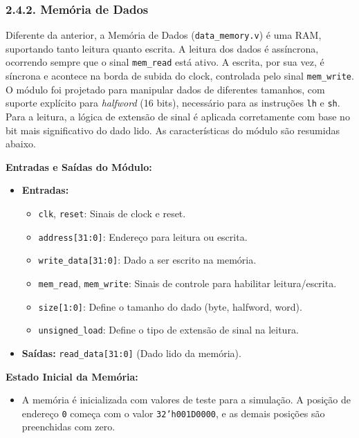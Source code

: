 \documentclass[12pt, a4paper]{article}
\begin{document}
\subsubsection*{2.4.2. Memória de Dados}

Diferente da anterior, a Memória de Dados (\texttt{data\_memory.v}) é uma RAM, suportando tanto leitura quanto escrita. A leitura dos dados é assíncrona, ocorrendo sempre que o sinal \texttt{mem\_read} está ativo. A escrita, por sua vez, é síncrona e acontece na borda de subida do clock, controlada pelo sinal \texttt{mem\_write}.
\\[0.5cm]
O módulo foi projetado para manipular dados de diferentes tamanhos, com suporte explícito para \textit{halfword} (16 bits), necessário para as instruções \texttt{lh} e \texttt{sh}. Para a leitura, a lógica de extensão de sinal é aplicada corretamente com base no bit mais significativo do dado lido. As características do módulo são resumidas abaixo.

\vspace{0.5cm}
\textbf{Entradas e Saídas do Módulo:}
\begin{itemize}
    \item \textbf{Entradas:}
    \begin{itemize}
        \item \texttt{clk}, \texttt{reset}: Sinais de clock e reset.
        \item \texttt{address[31:0]}: Endereço para leitura ou escrita.
        \item \texttt{write\_data[31:0]}: Dado a ser escrito na memória.
        \item \texttt{mem\_read}, \texttt{mem\_write}: Sinais de controle para habilitar leitura/escrita.
        \item \texttt{size[1:0]}: Define o tamanho do dado (byte, halfword, word).
        \item \texttt{unsigned\_load}: Define o tipo de extensão de sinal na leitura.
    \end{itemize}
    \item \textbf{Saídas:} \texttt{read\_data[31:0]} (Dado lido da memória).
\end{itemize}

\textbf{Estado Inicial da Memória:}
\begin{itemize}
    \item A memória é inicializada com valores de teste para a simulação. A posição de endereço \texttt{0} começa com o valor \texttt{32'h001D0000}, e as demais posições são preenchidas com zero.
\end{itemize}
\end{document}
